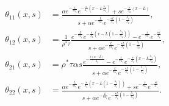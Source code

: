 \documentclass[preprint]{elsarticle}
\begin{document}
\begin{subequations}
\begin{align}
\theta_{11}\left(x,s\right) &=
\frac{
	\alpha 
		e^{
			-\frac{x}{\tau\lambda_{1}}
		}
		e^{
			-\frac{s}{\lambda_{1}}
				\left(
					x - L\frac{\lambda_{1}}{\lambda_{2}}
				\right)	
		}
	+
	s 
		e^{-\frac{s}{\lambda_{2}}\left(x - L\right)}
}{
	s
	+
	\alpha
	e^{-\frac{L}{\tau\lambda_{1}}}
	e^{
	-\frac{sL}{\lambda_{1}}
	\left(
		1 - \frac{\lambda_{1}}{\lambda_{2}}
	\right)
	}
}
,\\
\theta_{12}\left(x,s\right) &=
\frac{1}{\rho^{*}\tau}
\frac{
	e^{-\frac{L}{\tau\lambda_{1}}}
	e^{-\frac{s}{\lambda_{2}}
		\left(
			x - L
				\left(1 - 
					\frac{\lambda_{2}}{\lambda_{1}}
				\right)
		\right)
	}
	-
	e^{-\frac{x}{\tau\lambda_{1}}}
	e^{-\frac{sx}{\lambda_{1}}}
}
{
	s
	+
	\alpha
	e^{-\frac{L}{\tau\lambda_{1}}}
	e^{
	-\frac{sL}{\lambda_{1}}
	\left(
		1 - \frac{\lambda_{1}}{\lambda_{2}}
	\right)
	}
},\\
\theta_{21}\left(x,s\right) &=
\rho^{*}\tau\alpha s
\frac{
	e^{-\frac{s\left(x-L\right)}{\lambda_{2}}}
	-
	e^{-\frac{x}{\tau\lambda_{1}}}
	e^{-\frac{s}{\lambda_{1}}
		\left(
			x - L\frac{\lambda_{1}}{\lambda_{2}}
		\right)
	}
}{
	s
	+
	\alpha
	e^{-\frac{L}{\tau\lambda_{1}}}
	e^{
	-\frac{sL}{\lambda_{1}}
	\left(
		1 - \frac{\lambda_{1}}{\lambda_{2}}
	\right)
	}
},\\
\theta_{22}\left(x,s\right) &=
\frac{
	\alpha
	e^{-\frac{L}{\tau\lambda_{1}}}
	e^{-\frac{s}{\lambda_{2}}
		\left(
			x - L
				\left(
				1 - \frac{\lambda_{2}}{\lambda_{1}}
				\right)
		\right)
	}
	+
	s
	e^{-\frac{x}{\tau\lambda_{1}}}
	e^{-\frac{sx}{\lambda_{1}}}
}{
	s
	+
	\alpha
	e^{-\frac{L}{\tau\lambda_{1}}}
	e^{
	-\frac{sL}{\lambda_{1}}
	\left(
		1 - \frac{\lambda_{1}}{\lambda_{2}}
	\right)
	}
}
.
\end{align}
\end{subequations}
\end{document}

